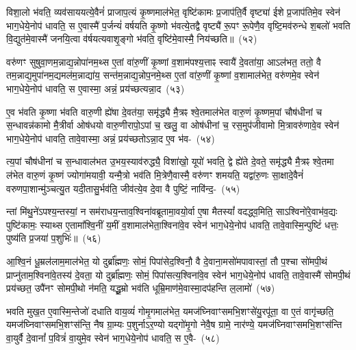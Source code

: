 विशा॒लो भ॑वति॒ व्यव॑साययत्ये॒वैनं॑ प्राजाप॒त्यं कृ॒ष्णमा\-ल॑भेत॒ वृष्टि॑कामः प्र॒जा\-प॑ति॒र्वै वृष्ट्या॑ ईशे प्र॒जा\-प॑तिमे॒व स्वेन॑ भाग॒धेये॒नोप॑ धावति॒ स ए॒वास्मै॑ प॒र्जन्यं॑ वर्\mbox{}षयति कृ॒ष्णो भ॑वत्ये॒तद्वै वृष्ट्यै॑ रू॒पꣳ रू॒पेणै॒व वृष्टि॒मव॑\-रुन्धे श॒बलो॑ भवति वि॒द्युत॑मे॒वास्मै॑ जनयि॒त्वा व॑र्\mbox{}षयत्यवाशृ॒ङ्गो भ॑वति॒ वृष्टि॑मे॒वास्मै॒ निय॑च्छति॥~(५२)\ip

{\anuvakamend[शृ॒णाति॑ मिथु॒नाना᳚न्नयति यच्छति॥]}

वरु॑णꣳ सुषुवा॒णम॒न्नाद्य॒न्नोपा॑नम॒थ्स ए॒तां वा॑रु॒णीं कृ॒ष्णां व॒शाम॑पश्य॒त्ताꣴ स्वायै॑ दे॒वता॑या॒ आ\-ऽल॑भत॒ ततो॒ वै तम॒न्नाद्य॒मुपा॑नम॒द्यमल॑म॒न्नाद्या॑य॒ सन्त॑म॒न्नाद्य॒न्नोप॒नमे॒थ्स ए॒तां वा॑रु॒णीं कृ॒ष्णां व॒शामा\-ल॑भेत॒ वरु॑णमे॒व स्वेन॑ भाग॒धेये॒नोप॑ धावति॒ स ए॒वास्मा॒ अन्नं॒ प्रय॑च्छत्यन्ना॒द~(५३)\ip

ए॒व भ॑वति कृ॒ष्णा भ॑वति वारु॒णी ह्ये॑षा दे॒वत॑या॒ समृ॑द्ध्यै मै॒त्रꣴ श्वे॒तमाल॑भेत वारु॒णं कृ॒ष्णम॒पां चौष॑धीनां च स॒न्धावन्न॑कामो मै॒त्रीर्वा ओष॑धयो वारु॒णीरापो॒\-ऽपां च॒ खलु॒ वा ओष॑धीनां च॒ रस॒मुप॑जीवामो मि॒त्रावरु॑णावे॒व स्वेन॑ भाग॒धेये॒नोप॑ धावति॒ तावे॒वास्मा॒ अन्नं॒ प्रय॑च्छतो\-ऽन्ना॒द ए॒व भ॑व-~(५४)\ip

त्य॒पां चौष॑धीनां च स॒न्धावाल॑भत उ॒भय॒स्याव॑रुद्ध्यै॒ विशा॑खो॒ यूपो॑ भवति॒ द्वे ह्ये॑ते दे॒वते॒ समृ॑द्ध्यै मै॒त्रꣴ श्वे॒तमा ल॑भेत वारु॒णं कृ॒ष्णं ज्योगा॑मयावी॒ यन्मै॒त्रो भव॑ति मि॒त्रेणै॒वास्मै॒ वरु॑णꣳ शमयति॒ यद्वा॑रु॒णः सा॒क्षादे॒वैनं॑ वरुण\-पा॒शान्मु॑ञ्चत्यु॒त यदी॒तासु॒र्भव॑ति॒ जीव॑त्ये॒व दे॒वा वै पुष्टिं॒ नावि॑न्द॒-~(५५)\ip

न्तां मि॑थु॒ने॑\-ऽपश्य॒न्तस्यां॒ न सम॑राधय॒न्ताव॒श्विना॑\-वब्रूतामा॒वयो॒र्वा ए॒षा मैतस्यां᳚ वदद्ध्व॒मिति॒ सा\-ऽश्विनो॑रे॒वाभ॑व॒द्यः पुष्टि॑कामः॒ स्याथ्स ए॒तामा᳚श्वि॒नीं य॒मीं व॒शामाल॑भे\-ता॒श्विना॑\-वे॒व स्वेन॑ भाग॒धेये॒नोप॑ धावति॒ तावे॒वास्मि॒न्पुष्टिं॑ धत्तः॒ पुष्य॑ति प्र॒जया॑ प॒शुभिः॑॥~(५६)\ip

{\anuvakamend[{अ॒न्ना॒दो᳚\-ऽन्ना॒द ए॒व भ॑वत्यविन्द॒न्पञ्च॑चत्वारिꣳशच्च}]}

आ॒श्वि॒नं धू॒म्रल॑लाम॒मा\-ल॑भेत॒ यो दुर्ब्रा᳚ह्मणः॒ सोमं॒ पिपा॑सेद॒श्विनौ॒ वै दे॒वाना॒मसो॑मपा\-वास्तां॒ तौ प॒श्चा सो॑मपी॒थं प्राप्नु॑ताम॒श्विना॑वे॒तस्य॑ दे॒वता॒ यो दुर्ब्रा᳚ह्मणः॒ सोमं॒ पिपा॑सत्य॒श्विना॑\-वे॒व स्वेन॑ भाग॒धेये॒नोप॑ धावति॒ तावे॒वास्मै॑ सोमपी॒थं प्रय॑च्छत॒ उपै॑नꣳ सोमपी॒थो न॑मति॒ यद्धू॒म्रो भव॑ति धूम्रि॒माण॑मे॒वास्मा॒दप॑हन्ति ल॒लामो॑~(५७)\ip

भवति मुख॒त ए॒वास्मि॒न्तेजो॑ दधाति वाय॒व्यं॑ गोमृ॒गमा\-ल॑भेत॒ यमज॑घ्निवाꣳसमभि॒\-शꣳसे॑यु॒रपू॑ता॒ वा ए॒तं वागृ॑च्छति॒ यमज॑घ्निवाꣳसमभि॒शꣳस॑न्ति॒ नैष ग्रा॒म्यः प॒शुर्ना\-ऽर॒ण्यो यद्गो॑मृ॒गो नेवै॒ष ग्रामे॒ नार॑ण्ये॒ यमज॑घ्निवाꣳसमभि॒शꣳस॑न्ति वा॒युर्वै दे॒वानां᳚ प॒वित्रं॑ वा॒युमे॒व स्वेन॑ भाग॒धेये॒नोप॑ धावति॒ स ए॒वै-~(५८)\ip

